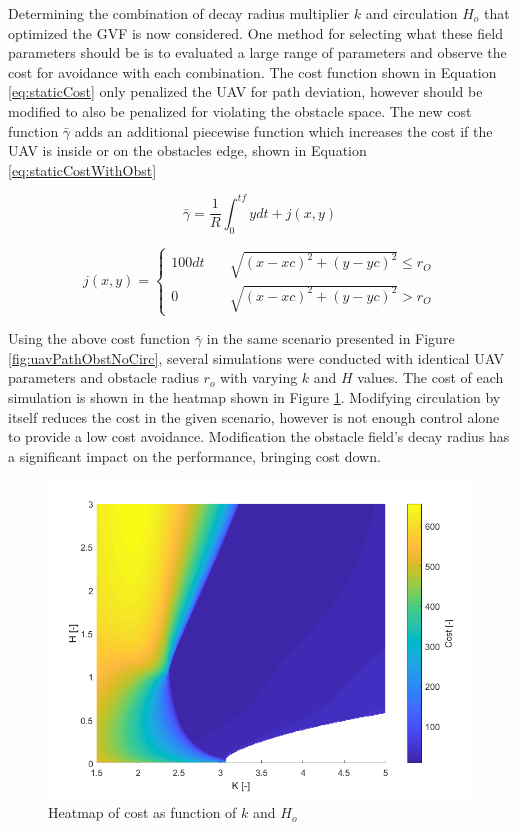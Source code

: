 \documentclass[numbered,pdftex]{ohio-etd}
\begin{document}
Determining the combination of decay radius multiplier $k$ and circulation $H_o$ that optimized the GVF is now considered. One method for selecting what these field parameters should be is to evaluated a large range of parameters and observe the cost for avoidance with each combination. The cost function shown in Equation \ref{eq:staticCost} only penalized the UAV for path deviation, however should be modified to also be penalized for violating the obstacle space. The new cost function $\bar{\gamma}$ adds an additional piecewise function which increases the cost if the UAV is inside or on the obstacles edge, shown in Equation \ref{eq:staticCostWithObst}


 \begin{equation}
\label{eq:staticCostWithObst}
\bar{\gamma} = \frac{1}{R}\int_{0}^{tf}ydt + j(x,y)
\end{equation}

\begin{equation}
j(x,y) = \left\{
\begin{array}{ll}
100dt & \quad \sqrt{(x-xc)^2+(y-yc)^2} \leq r_O \\
0 & \quad \sqrt{ (x-xc)^2+(y-yc)^2 } > r_O
\end{array}
\right.
\end{equation}


Using the above cost function $\bar{\gamma}$ in the same scenario presented in Figure \ref{fig:uavPathObstNoCirc}, several simulations were conducted with identical UAV parameters and obstacle radius $r_o$ with varying $k$ and $H$ values. The cost of each simulation is shown in the heatmap shown in Figure \ref{fig:costHandR}. Modifying circulation by itself reduces the cost in the given scenario, however is not enough control alone to provide a low cost avoidance. Modification the obstacle field's decay radius has a significant impact on the performance, bringing cost down.

\begin{figure}[H]
	\centering
	\includegraphics[trim=0 0 0 10,clip,width=16cm]{PaperFigures/Methods/costHandR}
	\caption{Heatmap of cost as function of $k$ and $H_o$}
	\label{fig:costHandR}
\end{figure}
\end{document}
